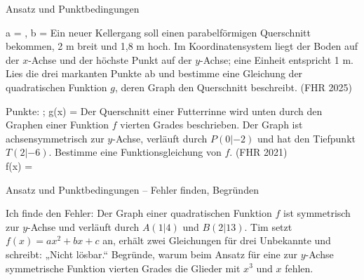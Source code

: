 \begin{aufgabe}{Ansatz und Punktbedingungen}
\begin{teile}
\begin{ksys}[xmin=-3,xmax=2,ymin=0,ymax=7,ablesen]  \end{ksys}
a = \leerfeld , b = \leerfeld
\teil Ein neuer Kellergang soll einen parabelförmigen Querschnitt bekommen, 2 m breit und 1,8 m hoch. Im Koordinatensystem liegt der Boden auf der $x$-Achse und der höchste Punkt auf der $y$-Achse; eine Einheit entspricht 1 m. Lies die drei markanten Punkte ab und bestimme eine Gleichung der quadratischen Funktion $g$, deren Graph den Querschnitt beschreibt. \hfill (FHR 2025) \\

\begin{ksys}[xmin=-2,xmax=2,ymin=0,ymax=2,ablesen]  \end{ksys}
Punkte: \leerfeld ; g(x) = \leerfeld
\teil Der Querschnitt einer Futterrinne wird unten durch den Graphen einer Funktion $f$ vierten Grades beschrieben. Der Graph ist achsensymmetrisch zur $y$-Achse, verläuft durch $P(0|-2)$ und hat den Tiefpunkt $T(2|-6)$. Bestimme eine Funktionsgleichung von $f$. \hfill (FHR 2021) \\ f(x) = \leerfeld
\end{teile}
\end{aufgabe}

\begin{aufgabe}{Ansatz und Punktbedingungen – Fehler finden, Begründen}
\begin{teile}
\teil Ich finde den Fehler: Der Graph einer quadratischen Funktion $f$ ist symmetrisch zur $y$-Achse und verläuft durch $A(1|4)$ und $B(2|13)$. Tim setzt $f(x) = ax^2 + bx + c$ an, erhält zwei Gleichungen für drei Unbekannte und schreibt: „Nicht lösbar.“
\teil Begründe, warum beim Ansatz für eine zur $y$-Achse symmetrische Funktion vierten Grades die Glieder mit $x^3$ und $x$ fehlen.
\end{teile}
\end{aufgabe}
